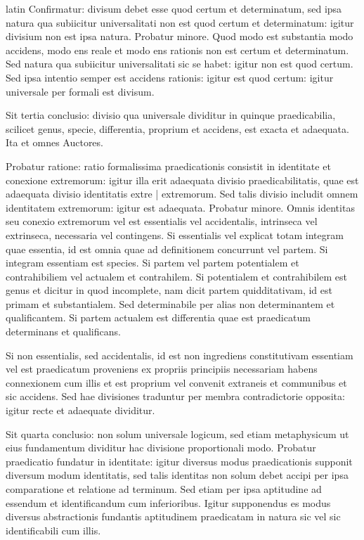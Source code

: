 \begin{otherlanguage*}{latin}
\pstart
  Confirmatur: divisum debet esse quod certum et determinatum, sed ipsa natura qua subiicitur universalitati non est quod certum et determinatum: igitur divisium non est ipsa natura. Probatur minore. Quod modo est substantia modo accidens, modo ens reale et modo ens rationis non est certum et determinatum. Sed natura qua subiicitur universalitati sic se habet: igitur non est quod certum. Sed ipsa intentio semper est accidens rationis: igitur est quod certum: igitur universale per formali est divisum. 
\pend

\pstart
  Sit tertia conclusio: divisio qua universale dividitur in quinque praedicabilia, scilicet genus, specie, differentia, proprium et accidens, est exacta et adaequata. Ita  et omnes Auctores. 
\pend

\pstart
  Probatur ratione: ratio formalissima praedicationis consistit in identitate et conexione extremorum: igitur illa erit adaequata divisio praedicabilitatis, quae est adaequata divisio identitatis extre \textnormal{|}    extremorum. Sed talis divisio includit omnem identitatem extremorum: igitur est adaequata. Probatur minore. Omnis identitas seu conexio extremorum vel est essentialis vel accidentalis, intrinseca vel extrinseca, necessaria vel contingens. Si essentialis vel explicat totam integram quae essentia, id est omnia quae ad definitionem concurrunt vel partem. Si integram essentiam est species. Si partem vel partem potentialem et contrahibiliem vel actualem et contrahilem. Si potentialem et contrahibilem est genus et dicitur in quod incomplete, nam dicit partem quidditativam, id est primam et substantialem. Sed determinabile per alias non determinantem et qualificantem. Si partem actualem est differentia quae est praedicatum determinans et qualificans. 
\pend

\pstart
  Si non essentialis, sed accidentalis, id est non ingrediens constitutivam essentiam vel est praedicatum proveniens ex propriis principiis necessariam habens connexionem cum illis et est proprium vel convenit extraneis et communibus et sic accidens. Sed hae divisiones traduntur per membra contradictorie opposita: igitur recte et adaequate dividitur. 
\pend

\pstart
  Sit quarta conclusio: non solum universale logicum, sed etiam metaphysicum ut eius fundamentum dividitur hac divisione proportionali modo. Probatur praedicatio fundatur in identitate: igitur diversus modus praedicationis supponit diversum modum identitatis, sed talis identitas non solum debet accipi per ipsa comparatione et relatione ad terminum. Sed etiam per ipsa aptitudine ad essendum et identificandum cum inferioribus. Igitur supponendus es modus diversus abstractionis fundantis aptitudinem praedicatam in natura sic vel sic identificabili cum illis. 
\pend


\end{otherlanguage*}
